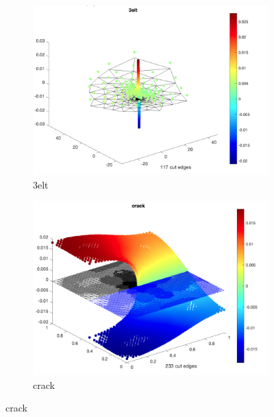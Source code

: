 \documentclass[unicode,11pt,a4paper,oneside,numbers=endperiod,openany]{scrartcl}
\begin{document}
\begin{figure}[htbp]
    \centering
    
    \begin{subfigure}[b]{0.4\textwidth}
        \includegraphics[width=\textwidth]{images/3elt.png}
        \caption{3elt}
    \end{subfigure}
    \hfill
    \begin{subfigure}[b]{0.4\textwidth}
        \includegraphics[width=\textwidth]{images/crack.png}
        \caption{crack} 
    \end{subfigure}
    
\end{figure}
\end{document}
